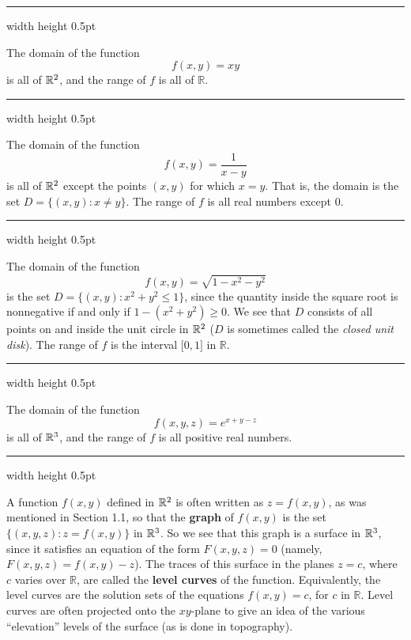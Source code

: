 \medskip
\hrule width \textwidth height 0.5pt
\begin{exmp}
 The domain of the function
 \begin{displaymath}
  f(x,y) = xy
 \end{displaymath}
 is all of $\mathbb{R}^{2}$, and the range of $f$ is all of $\mathbb{R}$.
\end{exmp}
\hrule width \textwidth height 0.5pt
\begin{exmp}
 The domain of the function
 \begin{displaymath}
  f(x,y) = \dfrac{1}{x-y}
 \end{displaymath}
 is all of $\mathbb{R}^{2}$ except the points $(x,y)$ for which $x = y$.
 That is, the domain is the set $D = \lbrace (x,y): x \ne y \rbrace$. 
 The range of $f$ is all real numbers except $0$.
\end{exmp}
\hrule width \textwidth height 0.5pt
\begin{exmp}
 The domain of the function
 \begin{displaymath}
  f(x,y) = \sqrt{1 - x^2 - y^2}
 \end{displaymath}
 is the set $D = \lbrace (x,y): x^2 + y^2 \le 1 \rbrace$, since the quantity inside the square root is nonnegative if
 and only if $1 - ( x^2 + y^2 ) \ge 0$. 
 We see that $D$ consists of all points on and inside the unit circle in
 $\mathbb{R}^{2}$ ($D$ is sometimes called the \emph{closed unit disk}). 
 The range of $f$ is the interval
 $\lbrack 0,1 \rbrack$ in $\mathbb{R}$.
\end{exmp}
\hrule width \textwidth height 0.5pt
\newpage
\begin{exmp}
 The domain of the function
 \begin{displaymath}
  f(x,y,z) = e^{x + y - z}
 \end{displaymath}
 is all of $\mathbb{R}^{3}$, and the range of $f$ is all positive real numbers.
\end{exmp}
\hrule width \textwidth height 0.5pt
\medskip

A function $f(x,y)$ defined in $\mathbb{R}^{2}$ is often written as $z = f(x,y)$, as was mentioned in Section 1.1,
so that the \textbf{graph} of $f(x,y)$ is the set $\lbrace (x,y,z): z = f(x,y) \rbrace$ in $\mathbb{R}^{3}$. 
So we see that this graph is a surface in $\mathbb{R}^{3}$, since it satisfies an equation of the form $F(x,y,z) = 0$ 
(namely, $F(x,y,z) = f(x,y) - z$). 
The traces of this surface in the planes $z  = c$, where $c$ varies over
$\mathbb{R}$, are called the \textbf{level curves} of the function. 
Equivalently, the level curves are the solution sets of the equations $f(x,y) = c$, for $c$ in $\mathbb{R}$. 
Level curves are often projected onto the $xy$-plane
to give an idea of the various ``elevation'' levels of the surface (as is done in topography).

